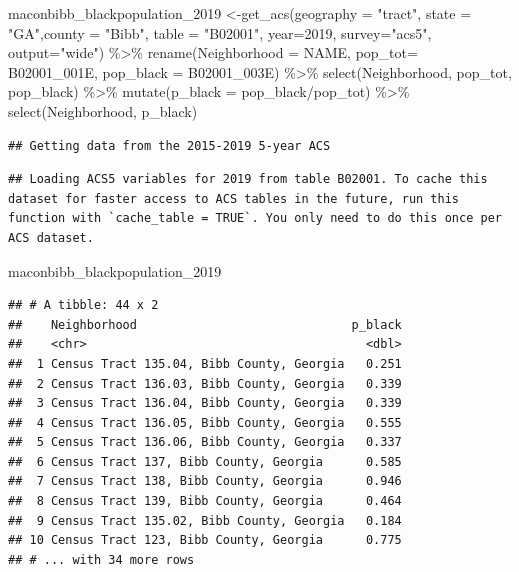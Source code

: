 \documentclass[
]{article}
\newenvironment{Shaded}{\begin{snugshade}}{\end{snugshade}}
\newcommand{\AttributeTok}[1]{\textcolor[rgb]{0.77,0.63,0.00}{#1}}
\newcommand{\DecValTok}[1]{\textcolor[rgb]{0.00,0.00,0.81}{#1}}
\newcommand{\FunctionTok}[1]{\textcolor[rgb]{0.00,0.00,0.00}{#1}}
\newcommand{\NormalTok}[1]{#1}
\newcommand{\OtherTok}[1]{\textcolor[rgb]{0.56,0.35,0.01}{#1}}
\newcommand{\SpecialCharTok}[1]{\textcolor[rgb]{0.00,0.00,0.00}{#1}}
\newcommand{\StringTok}[1]{\textcolor[rgb]{0.31,0.60,0.02}{#1}}
\begin{document}
\begin{Shaded}
\begin{Highlighting}[]
\NormalTok{maconbibb\_blackpopulation\_2019 }\OtherTok{\textless{}{-}}\FunctionTok{get\_acs}\NormalTok{(}\AttributeTok{geography =} \StringTok{"tract"}\NormalTok{, }\AttributeTok{state =} \StringTok{"GA"}\NormalTok{,}\AttributeTok{county =} \StringTok{"Bibb"}\NormalTok{, }\AttributeTok{table =} \StringTok{"B02001"}\NormalTok{, }\AttributeTok{year=}\DecValTok{2019}\NormalTok{, }\AttributeTok{survey=}\StringTok{"acs5"}\NormalTok{, }\AttributeTok{output=}\StringTok{"wide"}\NormalTok{) }\SpecialCharTok{\%\textgreater{}\%} 
\FunctionTok{rename}\NormalTok{(}\AttributeTok{Neighborhood =}\NormalTok{ NAME,}
       \AttributeTok{pop\_tot=}\NormalTok{ B02001\_001E,}
       \AttributeTok{pop\_black =}\NormalTok{ B02001\_003E) }\SpecialCharTok{\%\textgreater{}\%}
 \FunctionTok{select}\NormalTok{(Neighborhood, pop\_tot, pop\_black) }\SpecialCharTok{\%\textgreater{}\%}
 \FunctionTok{mutate}\NormalTok{(}\AttributeTok{p\_black =}\NormalTok{ pop\_black}\SpecialCharTok{/}\NormalTok{pop\_tot) }\SpecialCharTok{\%\textgreater{}\%}
 \FunctionTok{select}\NormalTok{(Neighborhood, p\_black)}
\end{Highlighting}
\end{Shaded}

\begin{verbatim}
## Getting data from the 2015-2019 5-year ACS
\end{verbatim}

\begin{verbatim}
## Loading ACS5 variables for 2019 from table B02001. To cache this dataset for faster access to ACS tables in the future, run this function with `cache_table = TRUE`. You only need to do this once per ACS dataset.
\end{verbatim}

\begin{Shaded}
\begin{Highlighting}[]
\NormalTok{maconbibb\_blackpopulation\_2019}
\end{Highlighting}
\end{Shaded}

\begin{verbatim}
## # A tibble: 44 x 2
##    Neighborhood                              p_black
##    <chr>                                       <dbl>
##  1 Census Tract 135.04, Bibb County, Georgia   0.251
##  2 Census Tract 136.03, Bibb County, Georgia   0.339
##  3 Census Tract 136.04, Bibb County, Georgia   0.339
##  4 Census Tract 136.05, Bibb County, Georgia   0.555
##  5 Census Tract 136.06, Bibb County, Georgia   0.337
##  6 Census Tract 137, Bibb County, Georgia      0.585
##  7 Census Tract 138, Bibb County, Georgia      0.946
##  8 Census Tract 139, Bibb County, Georgia      0.464
##  9 Census Tract 135.02, Bibb County, Georgia   0.184
## 10 Census Tract 123, Bibb County, Georgia      0.775
## # ... with 34 more rows
\end{verbatim}
\end{document}
